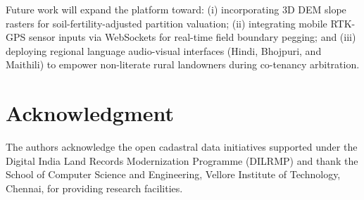 \documentclass[conference]{IEEEtran}
\begin{document}
Future work will expand the platform toward: (i) incorporating 3D DEM slope rasters for soil-fertility-adjusted partition valuation; (ii) integrating mobile RTK-GPS sensor inputs via WebSockets for real-time field boundary pegging; and (iii) deploying regional language audio-visual interfaces (Hindi, Bhojpuri, and Maithili) to empower non-literate rural landowners during co-tenancy arbitration.

\section*{Acknowledgment}
The authors acknowledge the open cadastral data initiatives supported under the Digital India Land Records Modernization Programme (DILRMP) and thank the School of Computer Science and Engineering, Vellore Institute of Technology, Chennai, for providing research facilities.
\end{document}
